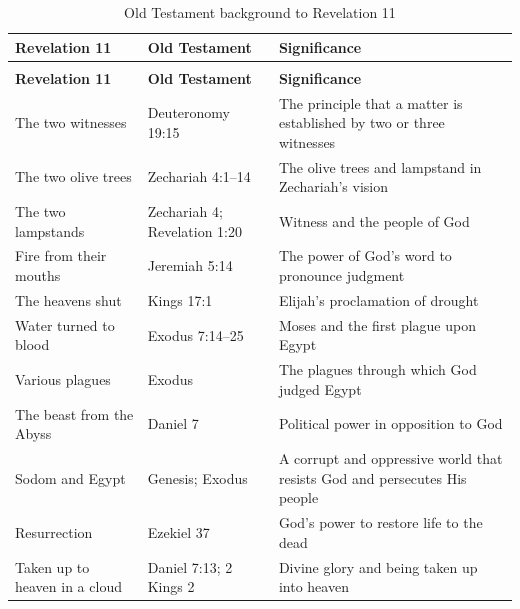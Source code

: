 {
\small
\renewcommand{\arraystretch}{1}

\begin{longtable}{
    @{}
    >{\raggedright\arraybackslash}p{} |
    >{\raggedright\arraybackslash}p{} |
    >{\raggedright\arraybackslash}p{}
    @{}
}
\caption{Old Testament background to Revelation 11}
\label{tab:rev11-ot-background} \\
\hline
\textbf{Revelation 11} & \textbf{Old Testament} & \textbf{Significance} \\
\hline
\endfirsthead

\multicolumn{3}{@{}l}{\small\itshape Table~\thetable\ (continued)} \\
\hline
\textbf{Revelation 11} & \textbf{Old Testament} & \textbf{Significance} \\
\hline
\endhead

\hline
\endfoot

\hline
\endlastfoot

The two witnesses
& Deuteronomy 19:15
& The principle that a matter is established by two or three witnesses \\
\hline
The two olive trees
& Zechariah 4:1--14
& The olive trees and lampstand in Zechariah's vision \\
\hline
The two lampstands
& Zechariah 4; Revelation 1:20
& Witness and the people of God \\
\hline
Fire from their mouths
& Jeremiah 5:14
& The power of God's word to pronounce judgment \\
\hline
The heavens shut
& 1 Kings 17:1
& Elijah's proclamation of drought \\
\hline
Water turned to blood
& Exodus 7:14--25
& Moses and the first plague upon Egypt \\
\hline
Various plagues
& Exodus
& The plagues through which God judged Egypt \\
\hline
The beast from the Abyss
& Daniel 7
& Political power in opposition to God \\
\hline
Sodom and Egypt
& Genesis; Exodus
& A corrupt and oppressive world that resists God and persecutes His people \\
\hline
Resurrection
& Ezekiel 37
& God's power to restore life to the dead \\
\hline
Taken up to heaven in a cloud
& Daniel 7:13; 2 Kings 2
& Divine glory and being taken up into heaven \\

\end{longtable}
}


